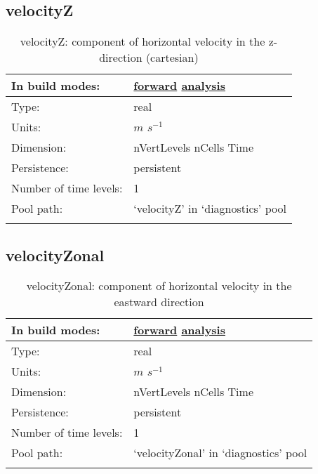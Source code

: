 \subsection[velocityZ]{velocityZ}
\label{subsec:var_sec_diagnostics_velocityZ}
\begin{center}
\begin{longtable}{| p{2.0in} | p{4.0in} |}
        \hline 
        In build modes: & \hyperref[subsec:forward_var_tab_diagnostics]{forward} \hyperref[subsec:analysis_var_tab_diagnostics]{analysis} \\
        \hline 
        Type: & real \\
        \hline 
        Units: & $m$ $s^{-1}$ \\
        \hline 
        Dimension: & nVertLevels nCells Time \\
        \hline 
        Persistence: & persistent \\
        \hline 
        Number of time levels: & 1 \\
        \hline 
            Pool path: & `velocityZ' in `diagnostics' pool \\
		 \hline 
    \caption{velocityZ: component of horizontal velocity in the z-direction (cartesian)}
\end{longtable}
\end{center}
\subsection[velocityZonal]{velocityZonal}
\label{subsec:var_sec_diagnostics_velocityZonal}
\begin{center}
\begin{longtable}{| p{2.0in} | p{4.0in} |}
        \hline 
        In build modes: & \hyperref[subsec:forward_var_tab_diagnostics]{forward} \hyperref[subsec:analysis_var_tab_diagnostics]{analysis} \\
        \hline 
        Type: & real \\
        \hline 
        Units: & $m$ $s^{-1}$ \\
        \hline 
        Dimension: & nVertLevels nCells Time \\
        \hline 
        Persistence: & persistent \\
        \hline 
        Number of time levels: & 1 \\
        \hline 
            Pool path: & `velocityZonal' in `diagnostics' pool \\
		 \hline 
    \caption{velocityZonal: component of horizontal velocity in the eastward direction}
\end{longtable}
\end{center}
